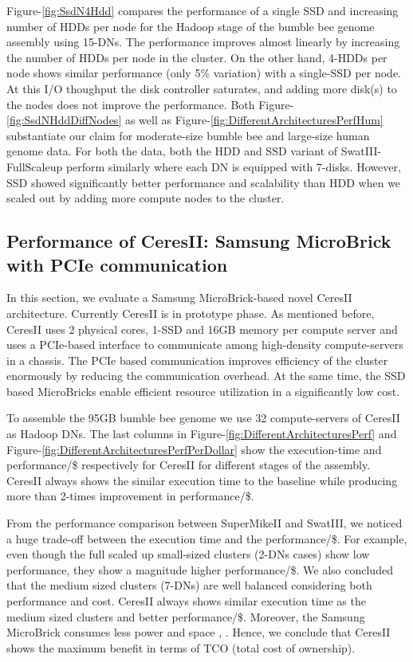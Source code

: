 \documentclass[10pt, conference, compsocconf]{IEEEtran}
\begin{document}
Figure-\ref{fig:SsdN4Hdd} compares the performance of a single SSD and increasing number of HDDs per node for the Hadoop stage of the bumble bee genome assembly using 15-DNs. The performance improves almost linearly by increasing the number of HDDs per node in the cluster. On the other hand, 4-HDDs per node shows similar performance (only 5\% variation) with a single-SSD per node. At this I/O thoughput the disk controller saturates, and adding more disk(s) to the nodes does not improve the performance. Both Figure-\ref{fig:SsdNHddDiffNodes} as well as Figure-\ref{fig:DifferentArchitecturesPerfHum} substantiate our claim for moderate-size bumble bee and large-size human genome data. For both the data, both the HDD and SSD variant of SwatIII-FullScaleup perform similarly where each DN is equipped with 7-disks. However, SSD showed significantly better performance and scalability than HDD when we scaled out by adding more compute nodes to the cluster.

\subsection {Performance of CeresII: Samsung MicroBrick with PCIe communication} \label{CeresII:Scaledout-in-a-boxAndSSD}
In this section, we evaluate a Samsung MicroBrick-based novel CeresII architecture. Currently CeresII is in prototype phase. As mentioned before, CeresII uses 2 physical cores, 1-SSD and 16GB memory per compute server and uses a PCIe-based interface to communicate among high-density compute-servers in a chassis. The PCIe based communication improves efficiency of the cluster enormously by reducing the communication overhead. At the same time, the SSD based MicroBricks enable efficient resource utilization in a significantly low cost. 

To assemble the 95GB bumble bee genome we use 32 compute-servers of CeresII as Hadoop DNs. The last columns in Figure-\ref{fig:DifferentArchitecturesPerf} and Figure-\ref{fig:DifferentArchitecturesPerfPerDollar} show the execution-time and performance/\$ respectively for CeresII for different stages of the assembly. CeresII always shows the similar execution time to the baseline while producing more than 2-times improvement in performance/\$.

From the performance comparison between SuperMikeII and SwatIII, we noticed a huge trade-off between the execution time and the performance/\$. For example, even though the full scaled up small-sized clusters (2-DNs cases) show low performance, they show a magnitude higher performance/\$. We also concluded that the medium sized clusters (7-DNs) are well balanced considering both performance and cost. CeresII always shows similar execution time as the medium sized clusters and better performance/\$. Moreover, the Samsung MicroBrick consumes less power and space \cite{Cluster:MicroBrick}, \cite{Cluster:ceres1}. Hence, we conclude that CeresII shows the maximum benefit in terms of TCO (total cost of ownership).
\end{document}
